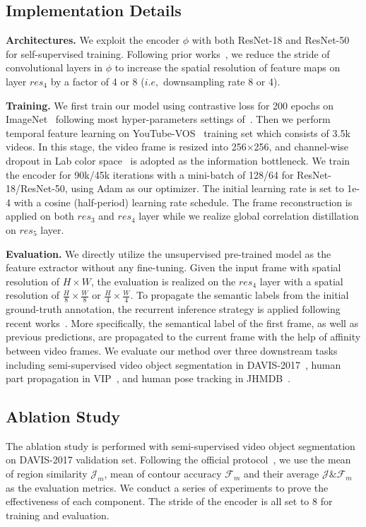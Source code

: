 \documentclass{article}
\begin{document}
\subsection{Implementation Details}
\textbf{Architectures.} We exploit the encoder $\phi$ with both ResNet-18 and ResNet-50~\cite{he2016deep} for self-supervised training. Following prior works~\cite{jabri2020space}\cite{lai2020mast}\cite{xu2021rethinking}, we reduce the stride of convolutional layers in $\phi$ to increase the spatial resolution of feature maps on layer $res_4$  by a factor of 4 or 8 ($i.e,$ downsampling rate 8 or 4).

\textbf{Training.}
We first train our model using contrastive loss for 200 epochs on ImageNet~\cite{deng2009large} following most hyper-parameters settings of~\cite{he2020momentum}. Then we perform temporal feature learning on YouTube-VOS~\cite{xu2018youtube} training set which consists of 3.5k videos. In this stage, the video frame is resized into 256$\times$256, and channel-wise dropout in Lab color space~\cite{lai2019self}\cite{lai2020mast} is adopted as the information bottleneck. We train the encoder for 90k/45k iterations with a mini-batch of 128/64 for ResNet-18/ResNet-50,  using Adam as our optimizer. The initial learning rate is set to 1e-4 with a cosine (half-period) learning rate schedule. The frame reconstruction is applied on both $res_3$ and $res_4$ layer while we realize global correlation distillation on $res_5$ layer.

\textbf{Evaluation.}
 We directly utilize the unsupervised pre-trained model as the feature extractor without any fine-tuning. Given the input frame with  spatial resolution of $H\times W$, the evaluation is realized on the $res_4$ layer with a spatial resolution of $\frac{H}{8} \times \frac{W}{8}$ or $\frac{H}{4} \times \frac{W}{4}$. To propagate the semantic labels from the initial ground-truth annotation, the recurrent inference strategy is applied following recent works~\cite{jabri2020space}\cite{lai2020mast}\cite{xu2021rethinking}. More specifically,  the semantical label of the first frame, as well as previous predictions, are propagated to the current frame with the help of affinity between video frames. We evaluate our method over three downstream tasks including semi-supervised video object segmentation in DAVIS-2017~\cite{pont20172017}, human part propagation in VIP~\cite{zhou2018adaptive}, and human pose tracking in JHMDB~\cite{jhuang2013towards}.

 \subsection{Ablation Study}
 The ablation study is performed with semi-supervised video object segmentation~\cite{pont20172017} on DAVIS-2017 validation set. Following the official protocol~\cite{pont20172017}, we use the mean of region similarity $\mathcal{J}_m$, mean of contour accuracy $\mathcal{F}_m$ and their average $\mathcal{J} \& \mathcal{F}_m$ as the evaluation metrics. We conduct a series of experiments to prove the effectiveness of each component. The stride of the encoder is all set to 8 for training and evaluation.
 
\end{document}
